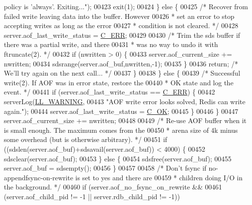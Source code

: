\begin{DoxyCode}
{{{{{{{{       policy is 'always'. Exiting..."});
00423             exit(1);
00424         \} \textcolor{keywordflow}{else} \{
00425             \textcolor{comment}{/* Recover from failed write leaving data into the buffer. However}
00426 \textcolor{comment}{             * set an error to stop accepting writes as long as the error}
00427 \textcolor{comment}{             * condition is not cleared. */}
00428             server.aof\_last\_write\_status = \hyperlink{server_8h_af98ac28d5f4d23d7ed5985188e6fb7d1}{C\_ERR};
00429 
00430             \textcolor{comment}{/* Trim the sds buffer if there was a partial write, and there}
00431 \textcolor{comment}{             * was no way to undo it with ftruncate(2). */}
00432             \textcolor{keywordflow}{if} (nwritten > 0) \{
00433                 server.aof\_current\_size += nwritten;
00434                 sdsrange(server.aof\_buf,nwritten,-1);
00435             \}
00436             \textcolor{keywordflow}{return}; \textcolor{comment}{/* We'll try again on the next call... */}
00437         \}
00438     \} \textcolor{keywordflow}{else} \{
00439         \textcolor{comment}{/* Successful write(2). If AOF was in error state, restore the}
00440 \textcolor{comment}{         * OK state and log the event. */}
00441         \textcolor{keywordflow}{if} (server.aof\_last\_write\_status == \hyperlink{server_8h_af98ac28d5f4d23d7ed5985188e6fb7d1}{C\_ERR}) \{
00442             serverLog(\hyperlink{server_8h_a31229b9334bba7d6be2a72970967a14b}{LL\_WARNING},
00443                 \textcolor{stringliteral}{"AOF write error looks solved, Redis can write again."});
00444             server.aof\_last\_write\_status = \hyperlink{server_8h_a303769ef1065076e68731584e758d3e1}{C\_OK};
00445         \}
00446     \}
00447     server.aof\_current\_size += nwritten;
00448 
00449     \textcolor{comment}{/* Re-use AOF buffer when it is small enough. The maximum comes from the}
00450 \textcolor{comment}{     * arena size of 4k minus some overhead (but is otherwise arbitrary). */}
00451     \textcolor{keywordflow}{if} ((sdslen(server.aof\_buf)+sdsavail(server.aof\_buf)) < 4000) \{
00452         sdsclear(server.aof\_buf);
00453     \} \textcolor{keywordflow}{else} \{
00454         sdsfree(server.aof\_buf);
00455         server.aof\_buf = sdsempty();
00456     \}
00457 
00458     \textcolor{comment}{/* Don't fsync if no-appendfsync-on-rewrite is set to yes and there are}
00459 \textcolor{comment}{     * children doing I/O in the background. */}
00460     \textcolor{keywordflow}{if} (server.aof\_no\_fsync\_on\_rewrite &&
00461         (server.aof\_child\_pid != -1 || server.rdb\_child\_pid != -1))
}}}}}}}
\end{DoxyCode}
